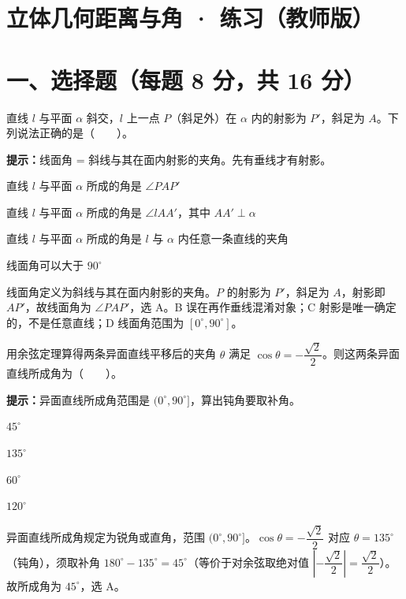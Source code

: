 \documentclass{exam-zh}
\begin{document}
\section*{立体几何距离与角 · 练习（教师版）}

\section*{一、选择题（每题 8 分，共 16 分）}


\begin{question}[points=8]
  直线 $l$ 与平面 $\alpha$ 斜交，$l$ 上一点 $P$（斜足外）在 $\alpha$ 内的射影为 $P'$，斜足为 $A$。下列说法正确的是（　　）。
  \begin{hintbox}
\textbf{提示：}线面角 = 斜线与其在面内射影的夹角。先有垂线才有射影。\end{hintbox}

  \begin{choices}
    \item 直线 $l$ 与平面 $\alpha$ 所成的角是 $\angle PAP'$
    \item 直线 $l$ 与平面 $\alpha$ 所成的角是 $\angle lAA'$，其中 $AA'\perp\alpha$
    \item 直线 $l$ 与平面 $\alpha$ 所成的角是 $l$ 与 $\alpha$ 内任意一条直线的夹角
    \item 线面角可以大于 $90^\circ$
  \end{choices}
  \paren[A]
  \begin{solutionblock}
    线面角定义为斜线与其在面内射影的夹角。$P$ 的射影为 $P'$，斜足为 $A$，射影即 $AP'$，故线面角为 $\angle PAP'$，选 A。B 误在再作垂线混淆对象；C 射影是唯一确定的，不是任意直线；D 线面角范围为 $[0^\circ,90^\circ]$。
  \end{solutionblock}
\end{question}



\begin{question}[points=8]
  用余弦定理算得两条异面直线平移后的夹角 $\theta$ 满足 $\cos\theta=-\dfrac{\sqrt2}{2}$。则这两条异面直线所成角为（　　）。
  \begin{hintbox}
\textbf{提示：}异面直线所成角范围是 $(0^\circ,90^\circ]$，算出钝角要取补角。\end{hintbox}

  \begin{choices}
    \item $45^\circ$
    \item $135^\circ$
    \item $60^\circ$
    \item $120^\circ$
  \end{choices}
  \paren[A]
  \begin{solutionblock}
    异面直线所成角规定为锐角或直角，范围 $(0^\circ,90^\circ]$。$\cos\theta=-\dfrac{\sqrt2}{2}$ 对应 $\theta=135^\circ$（钝角），须取补角 $180^\circ-135^\circ=45^\circ$（等价于对余弦取绝对值 $\left|-\dfrac{\sqrt2}{2}\right|=\dfrac{\sqrt2}{2}$）。故所成角为 $45^\circ$，选 A。
  \end{solutionblock}
\end{question}
\end{document}
